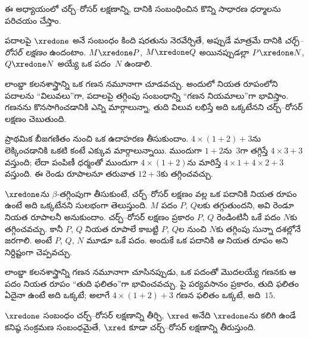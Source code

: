 \documentclass[../../../include/open-logic-section]{subfiles}
\begin{document}


ఈ అధ్యాయంలో చర్చ్--రోసర్ లక్షణాన్ని, దానికి సంబంధించిన
కొన్ని సాధారణ ధర్మాలను పరిచయం చేస్తాం.

\begin{defn}[చర్చ్--రోసర్ లక్షణం, CR] పదాలపై $\xredone$
  అనే సంబంధం కింది షరతును నెరవేర్చితే, అప్పుడే మాత్రమే దానికి
  \emph{చర్చ్--రోసర్ లక్షణం} ఉందంటాం. $M \xredone P$,
  $M \xredone Q$ అయినప్పుడల్లా $P \xredone N$,
  $Q \xredone N$ అయ్యే ఒక పదం~$N$ ఉండాలి.
\end{defn}

లాంబ్డా కలనశాస్త్రాన్ని ఒక గణన నమూనాగా చూడవచ్చు. అందులో నియత
రూపంలోని పదాలను “విలువలు”గా, పదాలపై తగ్గింపు సంబంధాన్ని “గణన నియమాలు”గా భావిస్తాం.
గణనను కొనసాగించడానికి ఎన్ని మార్గాలున్నా, తుది విలువ లభిస్తే అది ఒక్కటేనని
చర్చ్--రోసర్ లక్షణం చెబుతుంది.

ప్రాథమిక బీజగణితం నుంచి ఒక ఉదాహరణ తీసుకుందాం.
$4 \times (1+2) + 3$ను లెక్కించడానికి ఒకటి కంటే ఎక్కువ మార్గాలున్నాయి. ముందుగా
$1+2$ను~$3$గా తగ్గిస్తే $4 \times 3+3$ వస్తుంది;
లేదా పంపిణీ ధర్మంతో ముందుగా $4 \times (1+2)$ను
మారిస్తే $4 \times 1+4 \times 2+3$ వస్తుంది. ఈ రెండు
రూపాలనూ తరువాత $12+3$కు తగ్గించవచ్చు.

$\xredone$ను $\beta$-తగ్గింపుగా తీసుకుంటే, చర్చ్--రోసర్
లక్షణం వల్ల ఒక పదానికి నియత రూపం ఉంటే అది ఒక్కటేనని
సులభంగా తెలుస్తుంది. $M$ పదం $P$, $Q$లకు తగ్గుతుందని,
అవి రెండూ నియత రూపాలనీ అనుకుందాం. చర్చ్--రోసర్ లక్షణం
ప్రకారం $P$, $Q$ రెండింటినీ ఒకే పదం $N$కు తగ్గించవచ్చు. కానీ
$P$, $Q$ నియత రూపాలే కాబట్టి $P$, $Q$ల నుంచి $N$కు
తగ్గింపు సున్నా దశల్లోనే జరగాలి. అంటే $P$, $Q$, $N$
మూడూ ఒకే పదం. అందుకే ఒక పదానికి \emph{ఆ} నియత రూపం
అని నిర్దిష్టంగా చెప్పవచ్చు.

లాంబ్డా కలనశాస్త్రాన్ని గణన నమూనాగా చూసినప్పుడు, ఒక
పదంతో మొదలయ్యే గణనకు ఆ పదం నియత రూపం “తుది
ఫలితం”గా భావించవచ్చు. పై పర్యవసానం ప్రకారం, తుది
ఫలితం ఏదైనా ఉంటే అది ఒక్కటే; అలాగే $4 \times (1+2)+3$
గణన ఫలితం ఒక్కటే, అది~$15$.

\begin{thm} 
  $\xredone$ సంబంధం చర్చ్--రోసర్ లక్షణాన్ని తీర్చి,
  $\xred$ అనేది $\xredone$ను కలిగి ఉండే కనిష్ఠ
  సంక్రమణ సంబంధమైతే, $\xred$ కూడా చర్చ్--రోసర్
  లక్షణాన్ని తీరుస్తుంది.
\end{thm}
\end{document}
